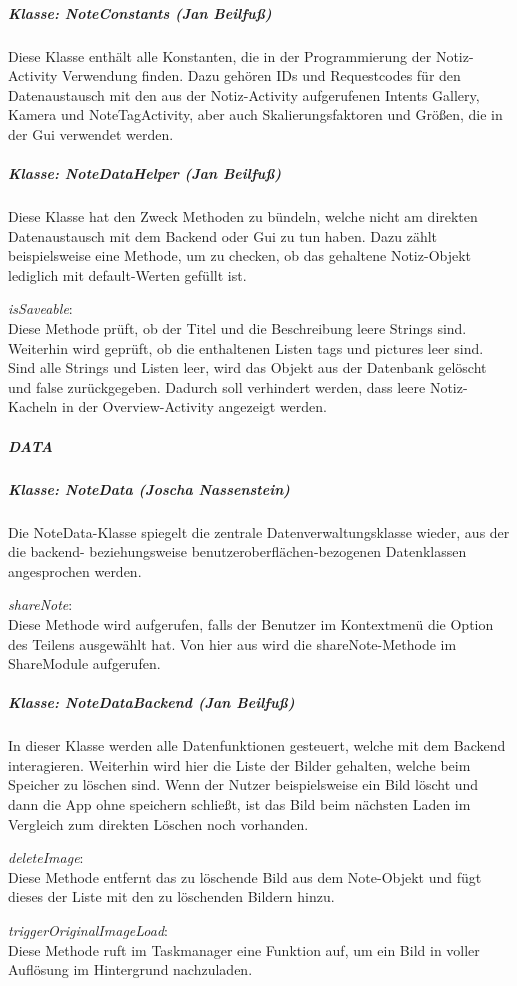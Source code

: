 \subparagraph{Klasse: NoteConstants (Jan Beilfuß)}
Diese Klasse enthält alle Konstanten, die in der Programmierung der Notiz-Activity Verwendung finden. Dazu gehören IDs und Requestcodes für den Datenaustausch mit den aus der Notiz-Activity aufgerufenen Intents Gallery, Kamera und NoteTagActivity, aber auch Skalierungsfaktoren und Größen, die in der Gui verwendet werden.

\subparagraph{Klasse: NoteDataHelper (Jan Beilfuß)}
Diese Klasse hat den Zweck Methoden zu bündeln, welche nicht am direkten Datenaustausch mit dem Backend oder Gui zu tun haben. Dazu zählt beispielsweise eine Methode, um zu checken, ob das gehaltene Notiz-Objekt lediglich mit default-Werten gefüllt ist.

\textit{isSaveable}:\\
 Diese Methode prüft, ob der Titel und die Beschreibung leere Strings sind. Weiterhin wird geprüft, ob die enthaltenen Listen tags und pictures leer sind. Sind alle Strings und Listen leer, wird das Objekt aus der Datenbank gelöscht und false zurückgegeben. Dadurch soll verhindert werden, dass leere Notiz-Kacheln in der Overview-Activity angezeigt werden.

\subparagraph{DATA}
\subparagraph{Klasse: NoteData (Joscha Nassenstein)}
Die NoteData-Klasse spiegelt die zentrale Datenverwaltungsklasse wieder, aus der die backend- beziehungsweise benutzeroberflächen-bezogenen Datenklassen angesprochen werden.

\textit{shareNote}:\\
Diese Methode wird aufgerufen, falls der Benutzer im Kontextmenü die Option des Teilens ausgewählt hat. Von hier aus wird die shareNote-Methode im ShareModule aufgerufen.

\subparagraph{Klasse: NoteDataBackend (Jan Beilfuß)}
In dieser Klasse werden alle Datenfunktionen gesteuert, welche mit dem Backend interagieren. Weiterhin wird hier die Liste der Bilder gehalten, welche beim Speicher zu löschen sind. Wenn der Nutzer beispielsweise ein Bild löscht und dann die App ohne speichern schließt, ist das Bild beim nächsten Laden im Vergleich zum direkten Löschen noch vorhanden.

\textit{deleteImage}:\\
Diese Methode entfernt das zu löschende Bild aus dem Note-Objekt und fügt dieses der Liste mit den zu löschenden Bildern hinzu.

\textit{triggerOriginalImageLoad}:\\
Diese Methode ruft im Taskmanager eine Funktion auf, um ein Bild in voller Auflösung im Hintergrund nachzuladen.

